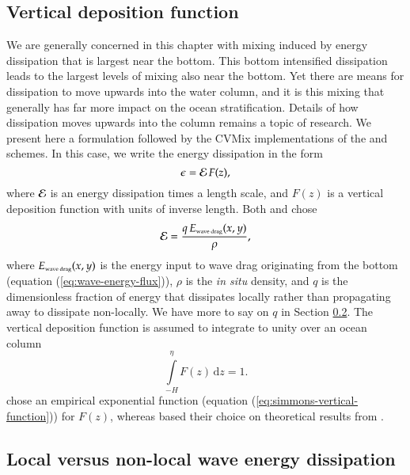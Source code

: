 \subsection{Vertical deposition function}
\label{subsection:vertical-deposition}

We are generally concerned in this chapter with mixing induced by
energy dissipation that is largest near the bottom.  This bottom
intensified dissipation leads to the largest levels of mixing also
near the bottom.  Yet there are means for dissipation to move upwards
into the water column, and it is this mixing that generally has far
more impact on the ocean stratification.  Details of how dissipation
moves upwards into the column remains a topic of research.  We present
here a formulation followed by the CVMix implementations of the
\cite{Simmonsetal2004} and \cite{Melet_etal_2013} schemes.  In this
case, we write the energy dissipation in the form
\begin{equation}
 \epsilon = {\cal E} \, F(z),
\label{eq:wave-drag-dissipation-form}
\end{equation}
where ${\cal E}$ is an energy dissipation times a length scale, and
$F(z)$ is a vertical deposition function with units of inverse length.
Both \cite{Simmonsetal2004} and \cite{Melet_etal_2013} chose
\begin{equation}
  {\cal E} =  \frac{ q \, E_{\mbox{\tiny wave drag}}(x,y)  }{\rho},
\label{eq:wave-dissipation-time-length}
\end{equation}
where $E_{\mbox{\tiny wave drag}}(x,y)$ is the energy input to wave
drag originating from the bottom (equation
(\ref{eq:wave-energy-flux})), $\rho$ is the {\it in situ} density, and
$q$ is the dimensionless fraction of energy that dissipates locally
rather than propagating away to dissipate non-locally. We have more to
say on $q$ in Section
\ref{subsection:local-or-non-local-energy-waves}.  The vertical
deposition function is assumed to integrate to unity over an ocean
column
\begin{equation}
  \int\limits_{-H}^{\eta} F(z) \, \mathrm{d}z = 1.  
\label{eq:normalization-of-Fz}
\end{equation}
\cite{Simmonsetal2004} chose an empirical exponential function
(equation (\ref{eq:simmons-vertical-function})) for $F(z)$, whereas
\cite{Melet_etal_2013} based their choice on theoretical results from
\cite{Polzin2009}.  


\subsection{Local versus non-local wave energy dissipation}
\label{subsection:local-or-non-local-energy-waves}

